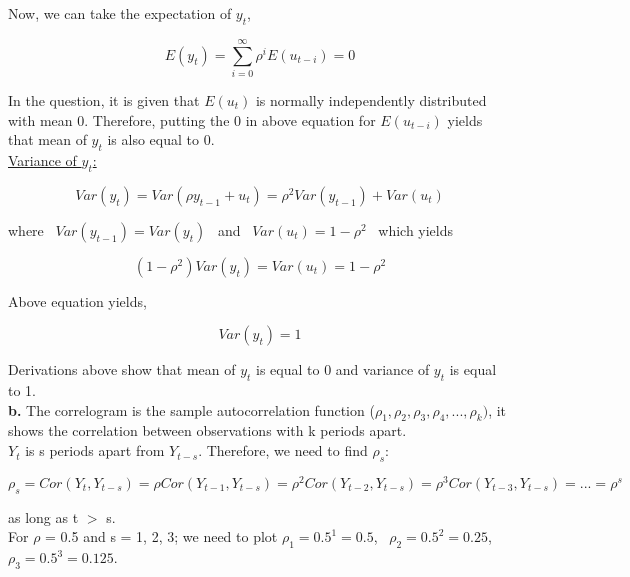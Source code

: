 \documentclass{article}
\begin{document}
Now, we can take the expectation of $y_t$,

\begin{equation}
    E(y_t) = \sum_{i=0}^\infty \rho^{i} E(u_{t-i}) = 0
\end{equation}

In the question, it is given that $E(u_t)$  is normally independently distributed with mean 0. Therefore, putting the 0 in above equation for $E(u_{t-i})$ yields that mean of $y_t$ is also equal to 0.
\\

\underline{Variance of $y_t$:}

\begin{equation}
    Var(y_t) = Var(\rho y_{t-1} + u_t) = \rho^2 Var(y_{t-1}) + Var(u_t)
\end{equation}

where \ $Var(y_{t-1}) = Var(y_t) $ \ and \ $Var(u_t) = 1 - \rho^2$ \ which yields

\begin{equation}
    (1-\rho^2)Var(y_t) = Var(u_t) = 1 - \rho^2
\end{equation}

Above equation yields,

\begin{equation}
    Var(y_t) = 1
\end{equation}

Derivations above show that mean of $y_t$ is equal to 0 and variance of $y_t$ is equal to 1.
\\

\textbf{b.} The correlogram is the sample
autocorrelation function ($\rho_1, \rho_2, \rho_3, \rho_4, ..., \rho_k)$, it shows the correlation between observations with k periods apart.
\\

$Y_t$ is s periods apart from $Y_{t-s}$. Therefore, we need to find ${\rho_s}$:

\begin{equation}
    \rho_s = Cor(Y_t, Y_{t-s}) = \rho Cor(Y_{t-1}, Y_{t-s}) =  \rho^2 Cor(Y_{t-2}, Y_{t-s}) =  \rho^3 Cor(Y_{t-3}, Y_{t-s}) = ... = \rho^s
\end{equation}

as long as t $>$ s.
\\

For $\rho$ = 0.5 and s = 1, 2, 3; we need to plot $\rho_1 = 0.5^1 = 0.5$, \ $\rho_2 = 0.5^2 = 0.25$,  \ $\rho_3 = 0.5^3 = 0.125$.
\end{document}
